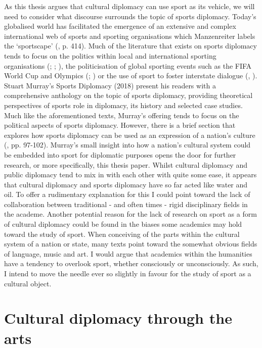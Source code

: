 As this thesis argues that cultural diplomacy can use sport as its vehicle, we will need to consider what discourse surrounds the topic of sports diplomacy. Today’s globalised world has facilitated the emergence of an extensive and complex international web of sports and sporting organisations which Manzenreiter labels the ‘sportscape’ (\citeyear{manzenreiter2008}, p. 414). Much of the literature that exists on sports diplomacy tends to focus on the politics within local and international sporting organisations (\cite{holt1999}; \cite{tomlinson2016}; \cite{cooley2018}), the politicisation of global sporting events such as the FIFA World Cup and Olympics (\cite{xu2008}; \cite{dowse2018}) or the use of sport to foster interstate dialogue (\cite{rowe2018}, \cite{shuman2018}). Stuart Murray’s Sports Diplomacy (2018) present his readers with a comprehensive anthology on the topic of sports diplomacy, providing theoretical perspectives of sports role in diplomacy, its history and selected case studies. Much like the aforementioned texts, Murray’s offering tends to focus on the political aspects of sports diplomacy. However, there is a brief section that explores how sports diplomacy can be used as an expression of a nation’s culture (\cite{murray2018}, pp. 97-102). Murray’s small insight into how a nation’s cultural system could be embedded into sport for diplomatic purposes opens the door for further research, or more specifically, this thesis paper. Whilst cultural diplomacy and public diplomacy tend to mix in with each other with quite some ease, it appears that cultural diplomacy and sports diplomacy have so far acted like water and oil. To offer a rudimentary explanation for this I could point toward the lack of collaboration between traditional - and often times - rigid disciplinary fields in the academe. Another potential reason for the lack of research on sport as a form of cultural diplomacy could be found in the biases some academics may hold toward the study of sport. When conceiving of the parts within the cultural system of a nation or state, many texts point toward the somewhat obvious fields of language, music and art. I would argue that academics within the humanities have a tendency to overlook sport, whether consciously or unconsciously. As such, I intend to move the needle ever so slightly in favour for the study of sport as a cultural object.

\section{Cultural diplomacy through the arts}

